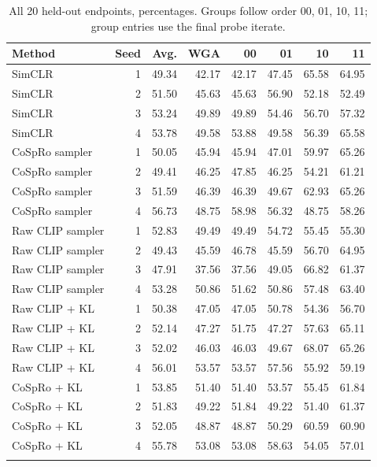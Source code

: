 \documentclass{article}
\begin{document}
\begin{table}[htbp]
\centering\small
\setlength{\tabcolsep}{4pt}
\caption{All 20 held-out endpoints, percentages. Groups follow order 00, 01, 10, 11; group entries use the final probe iterate.}
\begin{tabular}{lrrrrrrr}
\toprule
Method & Seed & Avg. & WGA & 00 & 01 & 10 & 11 \\
\midrule
SimCLR & 1 & 49.34 & 42.17 & 42.17 & 47.45 & 65.58 & 64.95 \\
SimCLR & 2 & 51.50 & 45.63 & 45.63 & 56.90 & 52.18 & 52.49 \\
SimCLR & 3 & 53.24 & 49.89 & 49.89 & 54.46 & 56.70 & 57.32 \\
SimCLR & 4 & 53.78 & 49.58 & 53.88 & 49.58 & 56.39 & 65.58 \\
\addlinespace
CoSpRo sampler & 1 & 50.05 & 45.94 & 45.94 & 47.01 & 59.97 & 65.26 \\
CoSpRo sampler & 2 & 49.41 & 46.25 & 47.85 & 46.25 & 54.21 & 61.21 \\
CoSpRo sampler & 3 & 51.59 & 46.39 & 46.39 & 49.67 & 62.93 & 65.26 \\
CoSpRo sampler & 4 & 56.73 & 48.75 & 58.98 & 56.32 & 48.75 & 58.26 \\
\addlinespace
Raw CLIP sampler & 1 & 52.83 & 49.49 & 49.49 & 54.72 & 55.45 & 55.30 \\
Raw CLIP sampler & 2 & 49.43 & 45.59 & 46.78 & 45.59 & 56.70 & 64.95 \\
Raw CLIP sampler & 3 & 47.91 & 37.56 & 37.56 & 49.05 & 66.82 & 61.37 \\
Raw CLIP sampler & 4 & 53.28 & 50.86 & 51.62 & 50.86 & 57.48 & 63.40 \\
\addlinespace
Raw CLIP + KL & 1 & 50.38 & 47.05 & 47.05 & 50.78 & 54.36 & 56.70 \\
Raw CLIP + KL & 2 & 52.14 & 47.27 & 51.75 & 47.27 & 57.63 & 65.11 \\
Raw CLIP + KL & 3 & 52.02 & 46.03 & 46.03 & 49.67 & 68.07 & 65.26 \\
Raw CLIP + KL & 4 & 56.01 & 53.57 & 53.57 & 57.56 & 55.92 & 59.19 \\
\addlinespace
CoSpRo + KL & 1 & 53.85 & 51.40 & 51.40 & 53.57 & 55.45 & 61.84 \\
CoSpRo + KL & 2 & 51.83 & 49.22 & 51.84 & 49.22 & 51.40 & 61.37 \\
CoSpRo + KL & 3 & 52.05 & 48.87 & 48.87 & 50.29 & 60.59 & 60.90 \\
CoSpRo + KL & 4 & 55.78 & 53.08 & 53.08 & 58.63 & 54.05 & 57.01 \\
\addlinespace
\bottomrule
\end{tabular}
\label{tab:testseeds}
\end{table}
\end{document}
